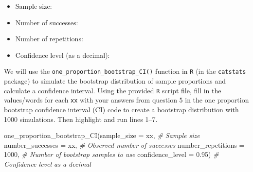\documentclass[
]{report}
\newenvironment{Shaded}{\begin{snugshade}}{\end{snugshade}}
\newcommand{\AttributeTok}[1]{\textcolor[rgb]{0.77,0.63,0.00}{#1}}
\newcommand{\CommentTok}[1]{\textcolor[rgb]{0.56,0.35,0.01}{\textit{#1}}}
\newcommand{\DecValTok}[1]{\textcolor[rgb]{0.00,0.00,0.81}{#1}}
\newcommand{\FloatTok}[1]{\textcolor[rgb]{0.00,0.00,0.81}{#1}}
\newcommand{\FunctionTok}[1]{\textcolor[rgb]{0.00,0.00,0.00}{#1}}
\newcommand{\NormalTok}[1]{#1}
\providecommand{\tightlist}{%
  \setlength{\itemsep}{0pt}\setlength{\parskip}{0pt}}
\begin{document}
\begin{itemize}
\tightlist
\item
  Sample size:
\end{itemize}

\vspace{.1in}

\begin{itemize}
\tightlist
\item
  Number of successes:
\end{itemize}

\vspace{.1in}

\begin{itemize}
\tightlist
\item
  Number of repetitions:
\end{itemize}

\vspace{.1in}

\begin{itemize}
\tightlist
\item
  Confidence level (as a decimal):
\end{itemize}

\vspace{.1in}

We will use the \texttt{one\_proportion\_bootstrap\_CI()} function in \texttt{R} (in the \texttt{catstats} package) to simulate the bootstrap distribution of sample proportions and calculate a confidence interval. Using the provided \texttt{R} script file, fill in the values/words for each \texttt{xx} with your answers from question 5 in the one proportion bootstrap confidence interval (CI) code to create a bootstrap distribution with 1000 simulations. Then highlight and run lines 1--7.

\begin{Shaded}
\begin{Highlighting}[]
\FunctionTok{one\_proportion\_bootstrap\_CI}\NormalTok{(}\AttributeTok{sample\_size =}\NormalTok{ xx, }\CommentTok{\# Sample size}
                    \AttributeTok{number\_successes =}\NormalTok{ xx, }\CommentTok{\# Observed number of successes}
                    \AttributeTok{number\_repetitions =} \DecValTok{1000}\NormalTok{, }\CommentTok{\# Number of bootstrap samples to use}
                    \AttributeTok{confidence\_level =} \FloatTok{0.95}\NormalTok{) }\CommentTok{\# Confidence level as a decimal}
\end{Highlighting}
\end{Shaded}
\end{document}
